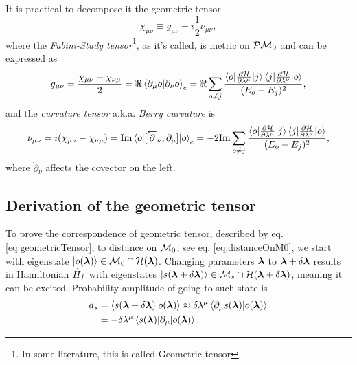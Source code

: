 It is practical to decompose it the geometric tensor
\begin{equation}
    \chi_{\mu\nu} \equiv g_{\mu\nu} - i\frac{1}{2} \nu_{\mu\nu},
\end{equation}
where the \emph{Fubini-Study tensor}\footnote{In some literature, this is called Geometric tensor}, as it's called, is metric on $\mathcal{P}\mathcal{M}_0$ and can be expressed as
\begin{equation}
    g_{\mu\nu} = \frac{\chi_{\mu\nu}+\chi_{\nu\mu}}{2} = \Re\braket{\partial_\mu o|\partial_\nu o}_c = \Re \sum_{o\neq j}\frac{\braket{o|\frac{\partial \mathcal{H}}{\partial \lambda^\mu}|j}\braket{j|\frac{\partial \mathcal{H}}{\partial \lambda^\nu}|o}}{(E_o-E_j)^2},
    \label{eq:metrictensorREdefinition}
\end{equation}
and the \emph{curvature tensor} a.k.a. \emph{Berry curvature} is
\begin{equation}
        \nu_{\mu\nu} = i(\chi_{\mu\nu}-\chi_{\nu\mu})= \textrm{Im}\braket{o|[\overleftarrow{\partial}_\nu,\partial_\mu]|o}_c = -2 \textrm{Im} \sum_{o\neq j}\frac{\braket{o|\frac{\partial \mathcal{H}}{\partial \lambda^\mu}|j}\braket{j|\frac{\partial \mathcal{H}}{\partial \lambda^\nu}|o}}{(E_o-E_j)^2},
    \label{eq:geom.tensorREdefinition}
\end{equation}
where $\overleftarrow{\partial}_\nu$ affects the covector on the left.


\subsection{Derivation of the geometric tensor}
\label{sec:derivationOfGeometricTensor}
To prove the correspondence of geometric tensor, described by eq. \ref{eq:geometricTensor}, to distance on $\mathcal{M}_0$, see eq. \ref{eq:distanceOnM0}, we start with eigenstate $\ket{o({\bm\lambda})}\in \mathcal{M}_0\cap \mathcal{H}({\bm\lambda})$. Changing parameters ${\bm\lambda}$ to ${\bm\lambda}+\delta {\bm\lambda}$ results in Hamiltonian $\hat{H}_f$ with eigenstates $\ket{s({\bm\lambda}+\delta {\bm\lambda})}\in \mathcal{M}_s\cap\mathcal{H}({\bm\lambda}+\delta {\bm\lambda})$, meaning it can be excited. Probability amplitude of going to such state is
\begin{equation}
    \begin{split}
        a_s&=\braket{s({\bm\lambda}+\delta{\bm\lambda})|o({\bm\lambda})}\approx \delta\lambda^\mu\braket{\partial_\mu s({\bm\lambda})|o({\bm\lambda})} \\
        &= -\delta\lambda^\mu\braket{s({\bm\lambda})|\partial_\mu|o({\bm\lambda})}.
    \end{split}
\end{equation}

